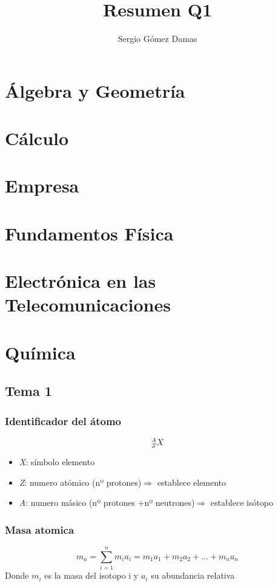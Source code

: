 \documentclass[a4paper,12pt]{article}
\title{Resumen Q1}
\author{Sergio Gómez Damas}
\begin{document}
\maketitle
\newpage

\section{Álgebra y Geometría}
\newpage
\section{Cálculo}
\newpage
\section{Empresa}
\newpage
\section{Fundamentos Física}
\newpage
\section{Electrónica en las Telecomunicaciones}
\newpage
\section{Química}
\subsection{Tema 1}
\subsubsection{Identificador del átomo}
\begin{equation}
    ^A_Z X
\end{equation}
\begin{itemize}
    \item \emph{X}: símbolo elemento
    \item \emph{Z}: numero atómico (nº protones)$\Rightarrow$ establece elemento
    \item \emph{A}: numero másico (nº protones +nº neutrones)$\Rightarrow$ establece isótopo
\end{itemize}
\subsubsection{Masa atomica}
\begin{equation}
    m_a=\sum^{n}_{i=1}m_ia_i=m_1a_1+m_2a_2+\dots+m_na_n
\end{equation}
Donde $m_i$ es la masa del isotopo i y $a_i$ su abundancia relativa
\end{document}
